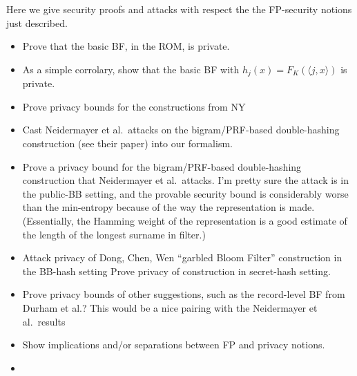  Here we give security proofs and attacks with respect the the FP-security notions just described.
\begin{itemize}
\item Prove that the basic BF, in the ROM, is private.   

\item As a simple corrolary, show that the basic BF with $h_j(x)=F_K(\langle j,x \rangle)$ is private.  

\item Prove privacy bounds for the constructions from NY

\item Cast Neidermayer et al.\ attacks on the bigram/PRF-based double-hashing construction (see their paper) into our formalism.   

\item Prove a privacy bound for the bigram/PRF-based double-hashing construction that Neidermayer et al.\ attacks. I'm pretty sure the attack is in the public-BB setting, and the provable security bound is considerably worse than the min-entropy because of the way the representation is made.  (Essentially, the Hamming weight of the representation is a good estimate of the length of the longest surname in filter.)  

\item Attack privacy of Dong, Chen, Wen ``garbled Bloom Filter'' construction in the BB-hash setting   Prove privacy of construction in secret-hash setting.  

\item Prove privacy bounds of other suggestions, such as the record-level BF from Durham et al.?  This would be a nice pairing with the Neidermayer et al.\ results

\item Show implications and/or separations between FP and privacy notions.

\item {}
\end{itemize}